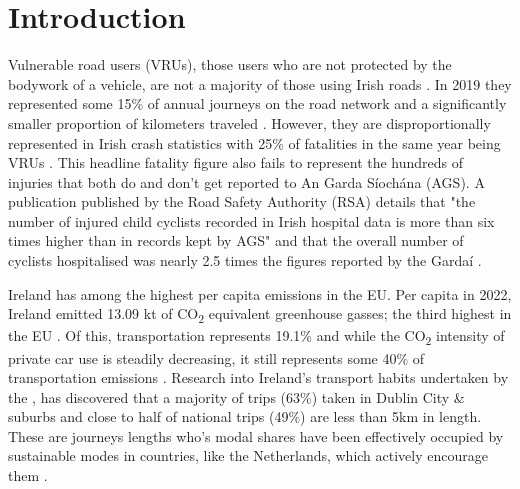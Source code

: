\chapter{Introduction}


Vulnerable road users (VRUs), those users who are not protected by the bodywork of a vehicle, are not a majority of those using Irish roads \citep{constantProtectingVulnerableRoad2010}. In 2019 they represented some 15\% of annual journeys on the road network and a significantly smaller proportion of kilometers traveled \citep{departmentoftransportTransportTrends20202020}. However, they are disproportionally represented in Irish crash statistics with 25\% of fatalities in the same year being VRUs \citep{rsaProvisionalReviewFatal2021}. This headline fatality figure also fails to represent the hundreds of injuries that both do and don't get reported to An Garda Síochána (AGS). A publication published by the Road Safety Authority (RSA) details that "the number of injured child cyclists recorded in Irish hospital data is more than six times higher than in records kept by AGS" and that the overall number of cyclists hospitalised was nearly 2.5 times the figures reported by the Gardaí \citep{castelloSeriousInjuriesPedal2023}.

Ireland has among the highest per capita emissions in the EU. Per capita in 2022, Ireland emitted 13.09 kt of CO\textsubscript{2} equivalent greenhouse gasses; the third highest in the EU \citep{eeaEEAGreenhouseGases2024}. Of this, transportation represents 19.1\% and while the CO\textsubscript{2} intensity of private car use is steadily decreasing, it still represents some 40\% of transportation emissions \citep{walshEnergyIreland20202021}. Research into Ireland's transport habits undertaken by the \citet{ntaNationalHouseholdTravel2022}, has discovered that a majority of trips (63\%) taken in Dublin City \& suburbs and close to half of national trips (49\%) are less than 5km in length. These are journeys lengths who's modal shares have been effectively occupied by sustainable modes in countries, like the Netherlands, which actively encourage them \citep{tonCyclingWalkingDeterminants2019}.

